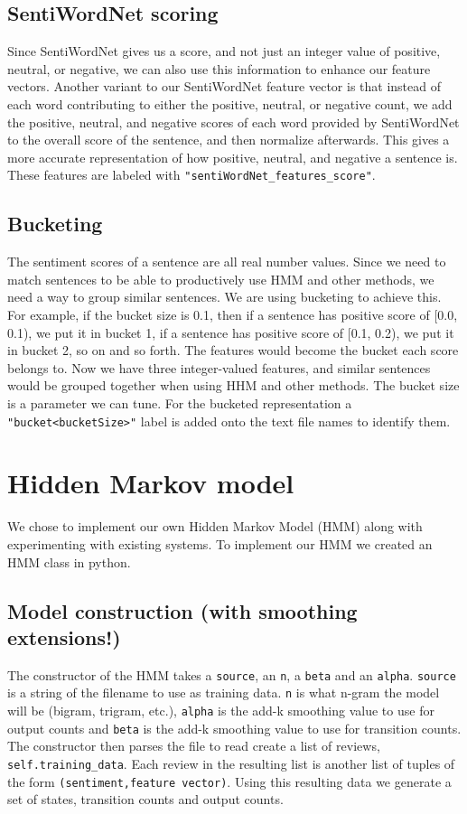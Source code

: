 \documentclass{article}
\begin{document}
\subsection{SentiWordNet scoring}
Since SentiWordNet gives us a score, and not just an integer value of positive, neutral, or negative, we can also use this information to enhance our feature vectors. Another variant to our SentiWordNet feature vector is that instead of each word contributing to either the positive, neutral, or negative count, we add the positive, neutral, and negative scores of each word provided by SentiWordNet to the overall score of the sentence, and then normalize afterwards. This gives a more accurate representation of how positive, neutral, and negative a sentence is. These features are labeled with \texttt{"sentiWordNet\_features\_score"}.

\subsection{Bucketing}
The sentiment scores of a sentence are all real number values. Since we need to match sentences to be able to productively use HMM and other methods, we need a way to group similar sentences. We are using bucketing to achieve this. For example, if the bucket size is 0.1, then if a sentence has positive score of [0.0, 0.1), we put it in bucket 1, if a sentence has positive score of [0.1, 0.2), we put it in bucket 2, so on and so forth. The features would become the bucket each score belongs to. Now we have three integer-valued features, and similar sentences would be grouped together when using HHM and other methods. The bucket size is a parameter we can tune. For the bucketed representation a \texttt{"bucket<bucketSize>"} label is added onto the text file names to identify them.


\section{Hidden Markov model}
We chose to implement our own Hidden Markov Model (HMM) along with experimenting with existing systems. To implement our HMM we created an HMM class in python.

\subsection{Model construction (with smoothing extensions!)}
The constructor of the HMM takes a \texttt{source}, an \texttt{n}, a \texttt{beta} and an \texttt{alpha}. \texttt{source} is a string of the filename to use as training data. \texttt{n} is what n-gram the model will be (bigram, trigram, etc.), \texttt{alpha} is the add-k smoothing value to use for output counts and \texttt{beta} is the add-k smoothing value to use for transition counts. The constructor then parses the file to read create a list of reviews, \texttt{self.training\_data}. Each review in the resulting list is another list of tuples of the form \texttt{(sentiment,feature vector)}. Using this resulting data we generate a set of states, transition counts and output counts.
\end{document}
